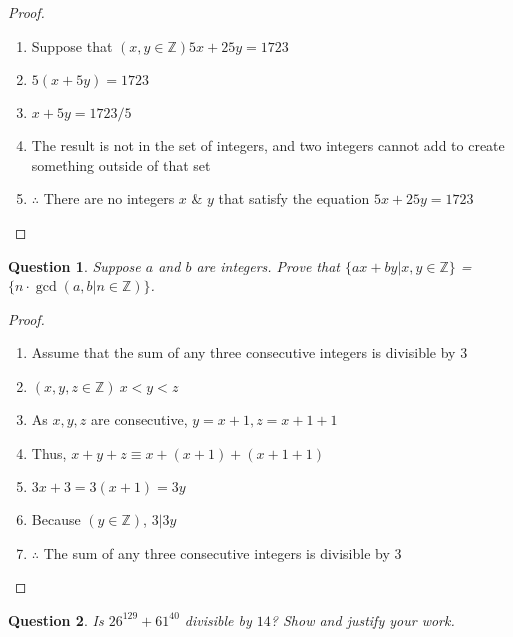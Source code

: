 \documentclass[11pt,oneside]{article}
\newtheorem{question}{Question}
\begin{document}
\begin{proof}
    \begin{enumerate}
        \item Suppose that $(x, y \in \mathbb{Z}) 5x + 25y = 1723$
        \item $5(x + 5y) = 1723$
        \item $x + 5y = 1723/5$
        \item The result is not in the set of integers, and two integers cannot add to create something outside of that set
        \item $\therefore$ There are no integers $x$ \& $y$ that satisfy the equation  $5x + 25y = 1723$
    \end{enumerate}
\end{proof}

\bigskip

\begin{question}
    Suppose $a$ and $b$ are integers. Prove that $\big\{ax+by | x,y \in \mathbb{Z}\big\}$ = $\big\{n \cdot \gcd(a,b | n \in \mathbb{Z})\big\}$.
\end{question}

\begin{proof}
    \begin{enumerate}
        \item Assume that the sum of any three consecutive integers is divisible by 3
        \item $(x,y,z \in \mathbb{Z}) \  x < y < z$
        \item As $x, y, z$ are consecutive, $y = x + 1, z = x + 1 + 1$
        \item Thus, $x + y + z \equiv x + (x + 1) + (x + 1 + 1)$
        \item $3x + 3 = 3(x + 1) = 3y$
        \item Because $(y \in \mathbb{Z})$, $3|3y$
        \item $\therefore$ The sum of any three consecutive integers is divisible by 3
    \end{enumerate}
\end{proof}

\bigskip

\begin{question}
    Is $26^{129} + 61^{40}$ divisible by $14$? Show and justify your work.
\end{question}
\end{document}
